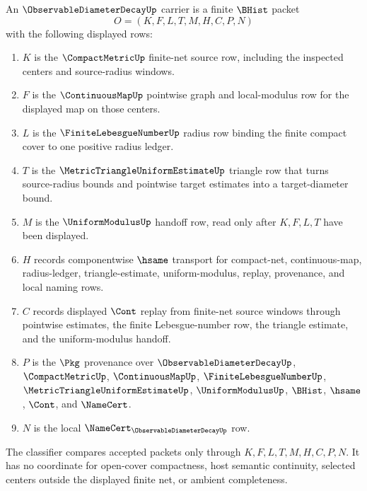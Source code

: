 \begin{definition}
\label{def:observable-diameter-decay-carrier}
An $\ObservableDiameterDecayUp$ carrier is a finite $\BHist$ packet
$$
O=(K,F,L,T,M,H,C,P,N)
$$
with the following displayed rows:
\begin{enumerate}
\item $K$ is the $\CompactMetricUp$ finite-net source row, including the inspected centers and source-radius windows.
\item $F$ is the $\ContinuousMapUp$ pointwise graph and local-modulus row for the displayed map on those centers.
\item $L$ is the $\FiniteLebesgueNumberUp$ radius row binding the finite compact cover to one positive radius ledger.
\item $T$ is the $\MetricTriangleUniformEstimateUp$ triangle row that turns source-radius bounds and pointwise target estimates into a target-diameter bound.
\item $M$ is the $\UniformModulusUp$ handoff row, read only after $K,F,L,T$ have been displayed.
\item $H$ records componentwise $\hsame$ transport for compact-net, continuous-map, radius-ledger, triangle-estimate, uniform-modulus, replay, provenance, and local naming rows.
\item $C$ records displayed $\Cont$ replay from finite-net source windows through pointwise estimates, the finite Lebesgue-number row, the triangle estimate, and the uniform-modulus handoff.
\item $P$ is the $\Pkg$ provenance over $\ObservableDiameterDecayUp$, $\CompactMetricUp$, $\ContinuousMapUp$, $\FiniteLebesgueNumberUp$, $\MetricTriangleUniformEstimateUp$, $\UniformModulusUp$, $\BHist$, $\hsame$, $\Cont$, and $\NameCert$.
\item $N$ is the local $\NameCert_{\ObservableDiameterDecayUp}$ row.
\end{enumerate}
The classifier compares accepted packets only through $K,F,L,T,M,H,C,P,N$. It has no coordinate for open-cover compactness, host semantic continuity, selected centers outside the displayed finite net, or ambient completeness.
\end{definition}

